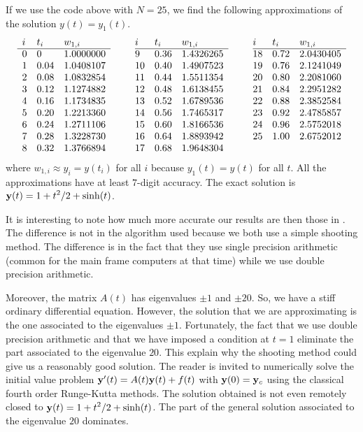 \begin{egg}
If we use the code above with $N=25$, we find the following approximations of
the solution $y(t) = y_1(t)$.
\[
\begin{array}{lllc@{\hspace{2em}}lllc@{\hspace{2em}}lll}
i & t_i & w_{1,i} & & i & t_i & w_{1,i} & & i & t_i & w_{1,i} \\ 
\cline{1-3} \cline{5-7} \cline{9-11}
0 & 0 & 1.0000000 & & 9 & 0.36 & 1.4326265 & & 18 & 0.72 & 2.0430405 \\
1 & 0.04 & 1.0408107 & & 10 & 0.40 & 1.4907523 & & 19 & 0.76 & 2.1241049 \\
2 & 0.08 & 1.0832854 & & 11 & 0.44 & 1.5511354 & & 20 & 0.80 & 2.2081060 \\
3 & 0.12 & 1.1274882 & & 12 & 0.48 & 1.6138455 & & 21 & 0.84 & 2.2951282 \\
4 & 0.16 & 1.1734835 & & 13 & 0.52 & 1.6789536 & & 22 & 0.88 & 2.3852584 \\
5 & 0.20 & 1.2213360 & & 14 & 0.56 & 1.7465317 & & 23 & 0.92 & 2.4785857 \\
6 & 0.24 & 1.2711106 & & 15 & 0.60 & 1.8166536 & & 24 & 0.96 & 2.5752018 \\
7 & 0.28 & 1.3228730 & & 16 & 0.64 & 1.8893942 & & 25 & 1.00 & 2.6752012 \\
8 & 0.32 & 1.3766894 & & 17 & 0.68 & 1.9648304 & &  & &
\end{array}
\]
where $w_{1,i} \approx y_i = y(t_i)$ for all $i$ because $y_1(t) = y(t)$
for all $t$.   All the approximations have at least $7$-digit
accuracy.  The exact solution is
$\displaystyle \mathbf{y}(t) = 1 + t^2/2 + \sinh(t)$.

It is interesting to note how much more accurate our results are then
those in \cite{CSD}.  The difference is not in the algorithm used
because we both use a simple shooting method.  The difference is in
the fact that they use single precision arithmetic (common for the
main frame computers at that time) while we use double precision
arithmetic.

Moreover, the matrix $A(t)$ has eigenvalues $\pm 1$ and $\pm 20$.
So, we have a stiff ordinary differential equation.  However, the
solution that we are approximating is the one associated to the
eigenvalues $\pm 1$.  Fortunately, the fact that we use double
precision arithmetic and that we have imposed a condition at $t=1$
eliminate the part associated to the eigenvalue $20$.  This explain
why the shooting method could give us a reasonably good solution.
The reader is invited to numerically solve the
initial value problem $\mathbf{y}'(t) = A(t) \mathbf{y}(t) + f(t)$ with
$\mathbf{y}(0) = \mathbf{y}_c$ using the classical fourth order Runge-Kutta
methods.  The solution obtained is not even remotely closed to
$\displaystyle \mathbf{y}(t) = 1 + t^2/2 + \sinh(t)$.  The part of the 
general solution associated to the eigenvalue $20$ dominates.
\label{eggShootCode2}
\end{egg}

